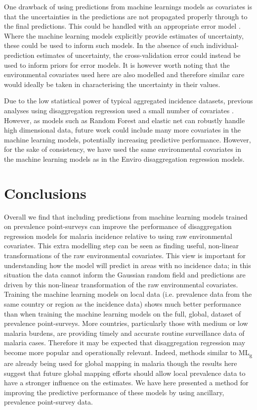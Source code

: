 \documentclass[review]{elsarticle}
\begin{document}
One drawback of using predictions from machine learnings models as covariates is that the uncertainties in the predictions are not propagated properly through to the final predictions.
This could be handled with an appropriate error model \citep{richardson1993conditional}.
Where the machine learning models explicitly provide estimates of uncertainty, these could be used to inform such models.
In the absence of such individual-prediction estimates of uncertainty, the cross-validation error could instead be used to inform priors for error models.
It is however worth noting that the environmental covariates used here are also modelled and therefore similar care would ideally be taken in characterising the uncertainty in their values. 

Due to the low statistical power of typical aggregated incidence datasets, previous analyses using disaggregation regression used a small number of covariates \citep{sturrock2014fine}.
However, as models such as Random Forest and elastic net can robustly handle high dimensional data, future work could include many more covariates in the machine learning models, potentially increasing predictive performance.
However, for the sake of consistency, we have used the same environmental covariates in the machine learning models as in the Enviro disaggregation regression models.





\section{Conclusions}

Overall we find that including predictions from machine learning models trained on prevalence point-surveys can improve the performance of disaggregation regression models for malaria incidence relative to using raw environmental covariates.
This extra modelling step can be seen as finding useful, non-linear transformations of the raw environmental covariates.
This view is important for understanding how the model will predict in areas with no incidence data; in this situation the data cannot inform the Gaussian random field and predictions are driven by this non-linear transformation of the raw environmental covariates.
Training the machine learning models on local data (i.e. prevalence data from the same country or region as the incidence data) shows much better performance than when training the machine learning models on the full, global, dataset of prevalence point-surveys.
More countries, particularly those with medium or low malaria burdens, are providing timely and accurate routine surveillance data of malaria cases.
Therefore it may be expected that disaggregation regression may become more popular and operationally relevant.
Indeed, methods similar to ML\textsubscript{g} are already being used for global mapping in malaria \citep{weiss2019mapping, battle2019mapping} though the results here suggest that future global mapping efforts should allow local prevalence data to have a stronger influence on the estimates.
We have here presented a method for improving the predictive performance of these models by using ancillary, prevalence point-survey data.
\end{document}
